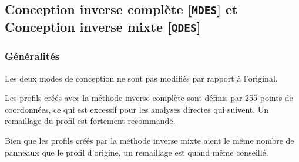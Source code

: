 \documentclass[a4paper,twoside,12pt,dvips]{article}
\begin{document}
\subsection{Conception inverse complète [\texttt{MDES}] et Conception inverse mixte [\texttt{QDES}]}

\subsubsection{Généralités}

Les deux modes de conception ne sont pas modifiés par rapport à l’original. 

Les profils créés avec la méthode inverse complète sont définis par 255 points de coordonnées, ce qui est excessif pour les analyses directes qui suivent. Un remaillage du profil est fortement recommandé.

Bien que les profils créés par la méthode inverse mixte aient le même nombre de panneaux que le profil d’origine, un remaillage est quand même conseillé. 
\end{document}
